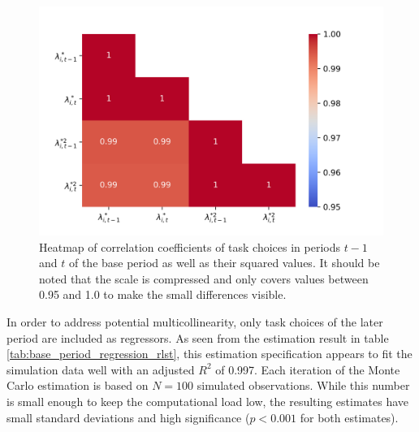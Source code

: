 \documentclass[../main.tex]{subfiles}
\begin{document}
\\
\begin{figure}[!htbp]
	\centering
	\includegraphics[scale=0.75]{./FIG/corr_heatmap.png} 
	\caption{Heatmap of correlation coefficients of task choices in periods $t-1$ and $t$ of the base period as well as their squared values. It should be noted that the scale is compressed and only covers values between 0.95 and 1.0 to make the small differences visible.}
	\label{fig:corr_heatmap}
\end{figure}
In order to address potential multicollinearity, only task choices of the later period are included as regressors. 
As seen from the estimation result in table \ref{tab:base_period_regression_rlst}, this estimation specification appears to fit the simulation data well with an adjusted $R^2$ of 0.997. Each iteration of the Monte Carlo estimation is based on $N=100$ simulated observations. While this number is small enough to keep the computational load low, the resulting estimates have small standard deviations and high significance ($p<0.001$ for both estimates).
\\
\end{document}

